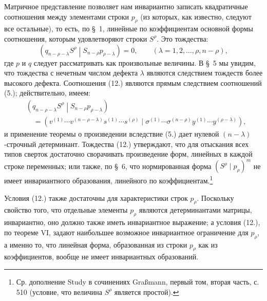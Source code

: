 \documentclass[11pt]{article}
\newcommand{\pair}[2]{\left(#1\middle|#2\right)}
\begin{document}
Матричное представление позволяет нам инвариантно записать квадратичные соотношения между элементами строки $p_\rho$ (из которых, как известно, следуют все остальные), то есть, по \S\ 1, линейные по коэффициентам основной формы соотношения, которым удовлетворяют строки $S^\rho$. Это тождества:
\begin{equation}
 \pair{q_{n-\rho-\lambda}S^\rho}{S_{n-\rho}p_{\rho-\lambda}}=0,
 \qquad (\lambda=1,2,\ldots,\rho,n-\rho),
\tag{12}
\end{equation}
где $p$ и $q$ следует рассматривать как произвольные величины. В \S\ 5 мы увидим, что тождества с нечетным числом дефекта $\lambda$ являются следствием тождеств более высокого дефекта. Соотношения (12.) являются прямым следствием соотношений (5.); действительно, имеем:
\[
\begin{aligned}
&\pair{q_{n-\rho-\lambda}S^\rho}{S_{n-\rho}p_{\rho-\lambda}}\\
&\quad
=(v^{(1)}\cdots v^{(n-\rho-\lambda)}s^{(1)}\cdots s^{(\rho)}
\mid \sigma^{(1)}\cdots\sigma^{(n-\rho)}y^{(1)}\cdots y^{(\rho-\lambda)}),
\end{aligned}
\]
и применение теоремы о произведении вследствие (5.) дает нулевой $(n-\lambda)$-строчный детерминант. Тождества (12.) утверждают, что для отыскания всех типов сверток достаточно сворачивать произведение форм, линейных в каждой строке переменных; или также, по \S\ 6, что нормированная форма $(S^\rho\mid p_\rho)^m$ не имеет инвариантного образования, линейного по коэффициентам.\footnote{Ср. дополнение Study в сочинениях Graßmann, первый том, вторая часть, с. 510 (условие, что величина $S^\rho$ является простой).}

Условия (12.) также достаточны для характеристики строк $p_\rho$. Поскольку свойство того, что отдельные элементы $p_\rho$ являются детерминантами матрицы, инвариантно, оно должно также иметь инвариантное выражение; а условия (12.), по теореме VI, задают наибольшее возможное инвариантное ограничение для $p_\rho$, а именно то, что линейная форма, образованная из строки $p_\rho$ как из коэффициентов, вообще не имеет инвариантных образований.
\end{document}
